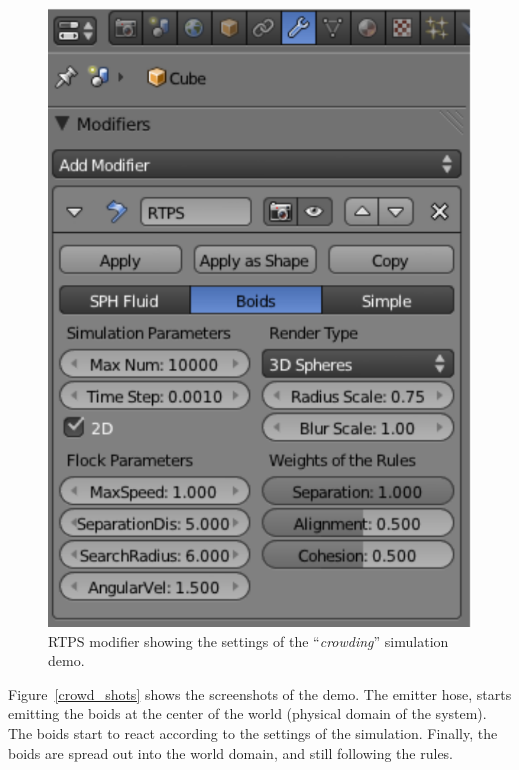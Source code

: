 \begin{figure}[htbp]
\begin{center}
\includegraphics[scale=0.8]{figures/demo_crowds_modifier.pdf}
\caption{RTPS modifier showing the settings of the ``\textit{crowding}'' simulation demo.}
\label{crowd_modifier}
\end{center}
\end{figure}

Figure~\ref{crowd_shots} shows the screenshots of the demo. The emitter hose, starts emitting the boids at the center of the world (physical domain of the system). The boids start to react according to the settings of the simulation. Finally, the boids are spread out into the world domain, and still following the rules.

